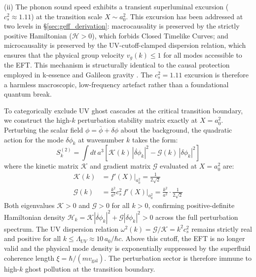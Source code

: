 \documentclass[aps,prd,10pt,twocolumn,superscriptaddress,nofootinbib,floatfix]{revtex4-2}
\begin{document}
(ii) The phonon sound speed exhibits a transient superluminal excursion ($c_s^2 \approx 1.11$) at the transition scale $X \sim a_0^2$. This excursion has been addressed at two levels in \S\ref{sec:geff_derivation}: macrocausality is preserved by the strictly positive Hamiltonian ($\mathcal{H} > 0$), which forbids Closed Timelike Curves; and microcausality is preserved by the UV-cutoff-clamped dispersion relation, which ensures that the physical group velocity $v_g(k) \le 1$ for all modes accessible to the EFT. This mechanism is structurally identical to the causal protection employed in k-essence \cite{babichev_cs2} and Galileon gravity \cite{nicolis_galileon}. The $c_s^2 = 1.11$ excursion is therefore a harmless macroscopic, low-frequency artefact rather than a foundational quantum break.

To categorically exclude UV ghost cascades at the critical transition boundary, we construct the high-$k$ perturbation stability matrix exactly at $X = a_0^2$. Perturbing the scalar field $\phi = \bar{\phi} + \delta\phi$ about the background, the quadratic action for the mode $\delta\phi_k$ at wavenumber $k$ takes the form:
\begin{equation}
S^{(2)}_k = \int dt\, a^3 \left[ \mathcal{K}(k)\,|\dot{\delta\phi}_k|^2 - \mathcal{G}(k)\,|\delta\phi_k|^2 \right]
\end{equation}
where the kinetic matrix $\mathcal{K}$ and gradient matrix $\mathcal{G}$ evaluated at $X = a_0^2$ are:
\begin{align}
\mathcal{K}(k) &= f'(X)\big|_{a_0^2} = \frac{1}{2\sqrt{2}} \\
\mathcal{G}(k) &= \frac{k^2}{a^2} c_s^2\, f'(X)\big|_{a_0^2} = \frac{k^2}{a^2} \cdot \frac{1}{2\sqrt{2}}
\end{align}
Both eigenvalues $\mathcal{K} > 0$ and $\mathcal{G} > 0$ for all $k > 0$, confirming positive-definite Hamiltonian density $\mathcal{H}_k = \mathcal{K}|\dot{\delta\phi}_k|^2 + \mathcal{G}|\delta\phi_k|^2 > 0$ across the full perturbation spectrum. The UV dispersion relation $\omega^2(k) = \mathcal{G}/\mathcal{K} = k^2 c_s^2$ remains strictly real and positive for all $k \le \Lambda_{UV} \approx 10\,a_0/\hbar c$. Above this cutoff, the EFT is no longer valid and the physical mode density is exponentially suppressed by the superfluid coherence length $\xi = \hbar/(m v_{\text{gal}})$. The perturbation sector is therefore immune to high-$k$ ghost pollution at the transition boundary.
\end{document}
